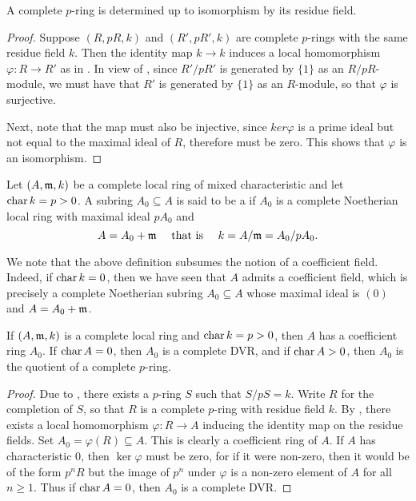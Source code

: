 \begin{corollary}
    A complete $p$-ring is determined up to isomorphism by its residue field.
\end{corollary}
\begin{proof}
    Suppose $(R, pR, k)$ and $(R', pR', k)$ are complete $p$-rings with the same residue field $k$. Then the identity map $k\to k$ induces a local homomorphism $\varphi\colon R\to R'$ as in . In view of , since $R'/pR'$ is generated by $\{1\}$ as an $R/pR$-module, we must have that $R'$ is generated by $\{1\}$ as an $R$-module, so that $\varphi$ is surjective.

    Next, note that the map must also be injective, since $ker\varphi$ is a prime ideal but not equal to the maximal ideal of $R$, therefore must be zero. This shows that $\varphi$ is an isomorphism.
\end{proof}

\begin{definition}
    Let $(A,\mathfrak{m}, k)$ be a complete local ring of mixed characteristic and let $\operatorname{char} k = p > 0$. A subring $A_0\subseteq A$ is said to be a  if $A_0$ is a complete Noetherian local ring with maximal ideal $pA_0$ and 
    \begin{equation*}
        A = A_0 + \mathfrak{m}\quad\text{ that is }\quad k = A/\mathfrak{m} = A_0/pA_0.
    \end{equation*}
\end{definition}

\begin{remark}
    We note that the above definition subsumes the notion of a coefficient field. Indeed, if $\operatorname{char} k = 0$, then we have seen that $A$ admits a coefficient field, which is precisely a complete Noetherian subring $A_0\subseteq A$ whose maximal ideal is $(0)$ and $A = A_0 + \mathfrak{m}$.
\end{remark}

\begin{theorem}
    If $(A,\mathfrak{m}, k)$ is a complete local ring and $\operatorname{char} k = p > 0$, then $A$ has a coefficient ring $A_0$. If $\operatorname{char} A = 0$, then $A_0$ is a complete DVR, and if $\operatorname{char} A > 0$, then $A_0$ is the quotient of a complete $p$-ring.
\end{theorem}
\begin{proof}
    Due to , there exists a $p$-ring $S$ such that $S/pS = k$. Write $R$ for the completion of $S$, so that $R$ is a complete $p$-ring with residue field $k$. By , there exists a local homomorphism $\varphi\colon R\to A$ inducing the identity map on the residue fields. Set $A_0 = \varphi(R)\subseteq A$. This is clearly a coefficient ring of $A$. If $A$ has characteristic $0$, then $\ker\varphi$ must be zero, for if it were non-zero, then it would be of the form $p^n R$ but the image of $p^n$ under $\varphi$ is a non-zero element of $A$ for all $n\ge 1$. Thus if $\operatorname{char} A = 0$, then $A_0$ is a complete DVR.
\end{proof}

